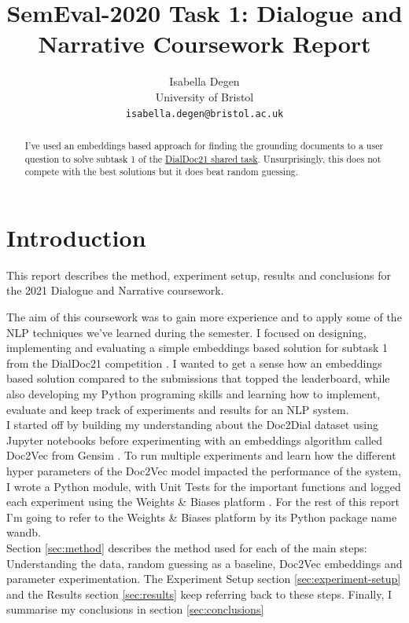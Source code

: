 \documentclass[11pt]{article}
\title{SemEval-2020 Task 1: Dialogue and Narrative Coursework Report}
\author{Isabella Degen \\ University of Bristol \\ {\tt isabella.degen@bristol.ac.uk}}
\date{}
\begin{document}
    \maketitle

    \begin{abstract}
        I've used an embeddings based approach for finding the
        grounding documents to a user question to solve subtask 1 of the
        \href{https://doc2dial.github.io/workshop2021/shared.html}{DialDoc21 shared task}. Unsurprisingly, this
        does not compete with the best solutions but it does beat random guessing.
    \end{abstract}


    \section{Introduction}\label{sec:introduction}
    This report describes the method, experiment setup, results and conclusions for the 2021 Dialogue and Narrative
    coursework.

    The aim of this coursework was to gain more experience and to apply some of the NLP techniques we've learned during
    the semester. I focused on designing, implementing and evaluating a simple embeddings based solution for
    subtask 1 from the DialDoc21
    competition \cite{feng-etal-2020-doc2dial}.
    I wanted to get a sense how an embeddings based solution compared to the submissions that topped the leaderboard,
    while also developing my Python programing skills and
    learning how to implement, evaluate and keep track of experiments and results for an NLP system.\\

    I started off by building my understanding about the Doc2Dial dataset \cite{feng-etal-2020-doc2dial} using Jupyter notebooks
    before experimenting with an embeddings algorithm called Doc2Vec from Gensim \cite{doc2vec}.
    To run multiple experiments and learn how the different hyper parameters of the Doc2Vec model impacted the performance of the
    system,
    I wrote a Python module, with Unit Tests for the important functions and logged each experiment using
    the Weights \& Biases platform \cite{wandb}. For the rest of this report I'm going to refer to the Weights \& Biases
    platform by its Python package name wandb.\\

    Section \ref{sec:method}
    describes the method used for each of the main steps: Understanding the data, random guessing as a baseline, Doc2Vec embeddings
    and parameter experimentation. The Experiment Setup section \ref{sec:experiment-setup} and the Results section \ref{sec:results}
    keep referring back to these steps. Finally, I summarise my conclusions in section \ref{sec:conclusions}
\end{document}
